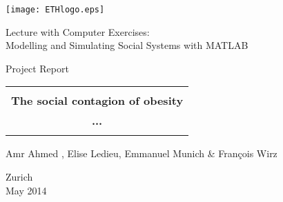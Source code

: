 \thispagestyle{empty}

\begin{center}
\texttt{[image: ETHlogo.eps]}

\bigskip


\bigskip


\bigskip


\LARGE{ 	Lecture with Computer Exercises:\\ }
\LARGE{ Modelling and Simulating Social Systems with MATLAB\\}

\bigskip

\bigskip

\small{Project Report}\\

\bigskip

\bigskip

\bigskip

\bigskip


\begin{tabular}{|c|}
\hline
\\
\textbf{\LARGE{The social contagion of obesity}}\\
\textbf{\LARGE{...}}\\
\\
\hline
\end{tabular}
\bigskip

\bigskip

\bigskip

\LARGE{Amr Ahmed , Elise Ledieu, Emmanuel Munich \& Fran\c{c}ois Wirz}



\bigskip

\bigskip

\bigskip

\bigskip

\bigskip

\bigskip

\bigskip

\bigskip

Zurich\\
May 2014\\

\end{center}
